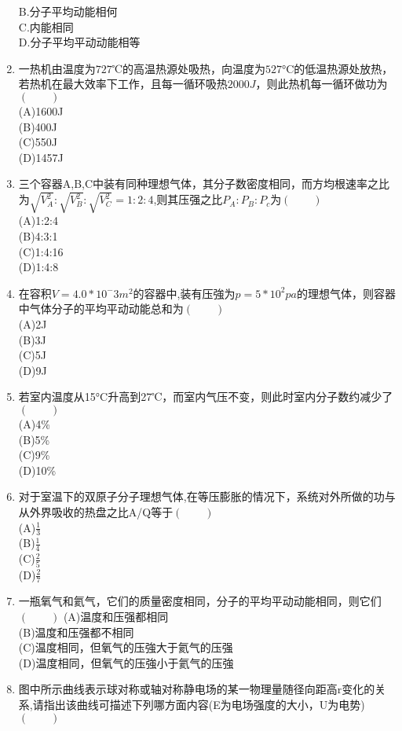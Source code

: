 \begin{enumerate}
B.分子平均动能相何\\
C.内能相同\\
D.分子平均平动动能相等
\item 一热机由温度为$727$℃的高温热源处吸热，向温度为$527$°C的低温热源处放热，若热机在最大效率下工作，且每一循环吸热$2000J$，则此热机每一循环做功为$(\qquad)$\\
(A)1600J\\
(B)400J\\
(C)550J\\
(D)1457J
\item 三个容器A,B,C中装有同种理想气体，其分子数密度相同，而方均根速率之比为$\sqrt{V^2_A }: \sqrt{V^2_B}:\sqrt{V^2_C}=1:2:4$,则其压强之比$P_A:P_B:P_c$为$(\qquad)$\\
(A)1:2:4\\
(B)4:3:1\\
(C)1:4:16\\
(D)1:4:8
\item 在容积$V=4.0*10^-3 m^2$的容器中,装有压強为$p=5*10^2pa$的理想气体，则容器中气体分子的平均平动动能总和为$(\qquad)$\\
(A)2J\\
(B)3J\\
(C)5J\\
(D)9J
\item 若室内温度从15°C升高到27℃，而室内气压不变，则此时室内分子数约减少了$(\qquad)$\\
(A)4\%\\
(B)5\%\\
(C)9\%\\
(D)10\%
\item 对于室温下的双原子分子理想气体,在等压膨胀的情况下，系统对外所做的功与从外界吸收的热盘之比A/Q等于$(\qquad)$\\
(A)$\displaystyle \frac{1}{3}$\\
(B)$\displaystyle \frac{1}{4}$\\
(C)$\displaystyle \frac{2}{5}$\\
(D)$\displaystyle \frac{2}{7}$
\item 一瓶氧气和氦气，它们的质量密度相同，分子的平均平动动能相同，则它们$(\qquad)$
(A)温度和压强都相同\\
(B)温度和压强都不相同\\
(C)温度相同，但氧气的压強大于氦气的压强\\
(D)温度相同，但氧气的压強小于氦气的压強
\item 图中所示曲线表示球对称或轴对称静电场的某一物理量随径向距高r变化的关系,请指出该曲线可描述下列哪方面内容(E为电场强度的大小，U为电势)$(\qquad)$

\end{enumerate}
